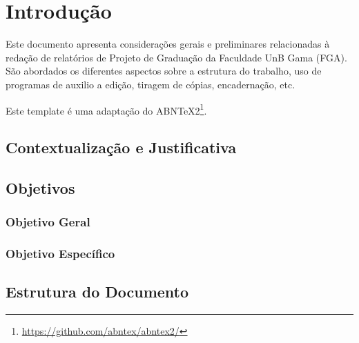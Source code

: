 \chapter[Introdução]{Introdução}

Este documento apresenta considerações gerais e preliminares relacionadas 
à redação de relatórios de Projeto de Graduação da Faculdade UnB Gama 
(FGA). São abordados os diferentes aspectos sobre a estrutura do trabalho, 
uso de programas de auxilio a edição, tiragem de cópias, encadernação, etc.

Este template é uma adaptação do ABNTeX2\footnote{\url{https://github.com/abntex/abntex2/}}.


\section{Contextualização e Justificativa}

\section{Objetivos}

    \subsection{Objetivo Geral}

    \subsection{Objetivo Específico}

\section{Estrutura do Documento}

